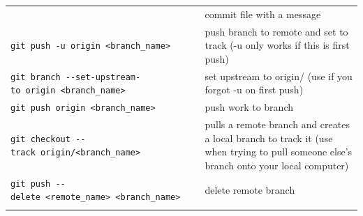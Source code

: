 \documentclass[]{book}
\begin{document}
\begin{longtable}[]{@{}ll@{}}
\begin{minipage}[t]{0.77\columnwidth}
\end{minipage} & \begin{minipage}[t]{0.17\columnwidth}\raggedright
commit file with a message\strut
\end{minipage}\tabularnewline
\begin{minipage}[t]{0.77\columnwidth}\raggedright
\texttt{git\ push\ -u\ origin\ \textless{}branch\_name\textgreater{}}\strut
\end{minipage} & \begin{minipage}[t]{0.17\columnwidth}\raggedright
push branch to remote and set to track (-u only works if this is first push)\strut
\end{minipage}\tabularnewline
\begin{minipage}[t]{0.77\columnwidth}\raggedright
\texttt{git\ branch\ -\/-set-upstream-to\ origin\ \textless{}branch\_name\textgreater{}}\strut
\end{minipage} & \begin{minipage}[t]{0.17\columnwidth}\raggedright
set upstream to origin/ (use if you forgot -u on first push)\strut
\end{minipage}\tabularnewline
\begin{minipage}[t]{0.77\columnwidth}\raggedright
\texttt{git\ push\ origin\ \textless{}branch\_name\textgreater{}}\strut
\end{minipage} & \begin{minipage}[t]{0.17\columnwidth}\raggedright
push work to branch\strut
\end{minipage}\tabularnewline
\begin{minipage}[t]{0.77\columnwidth}\raggedright
\texttt{git\ checkout\ -\/-track\ origin/\textless{}branch\_name\textgreater{}}\strut
\end{minipage} & \begin{minipage}[t]{0.17\columnwidth}\raggedright
pulls a remote branch and creates a local branch to track it (use when trying to pull someone else's branch onto your local computer)\strut
\end{minipage}\tabularnewline
\begin{minipage}[t]{0.77\columnwidth}\raggedright
\texttt{git\ push\ -\/-delete\ \textless{}remote\_name\textgreater{}\ \textless{}branch\_name\textgreater{}}\strut
\end{minipage} & \begin{minipage}[t]{0.17\columnwidth}\raggedright
delete remote branch\strut
\end{minipage}\tabularnewline
\begin{minipage}[t]{0.77\columnwidth}\raggedright

\end{minipage}
\end{longtable}
\end{document}
